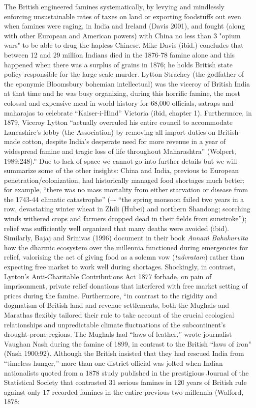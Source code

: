 The British engineered famines systematically, by levying and mindlessly enforcing unsustainable rates of taxes on land or exporting foodstuffs out even when famines were raging, in India and Ireland (Davis 2001), and fought (along with other European and American powers) with China no less than 3 "opium wars" to be able to drug the hapless Chinese. Mike Davis (ibid.) concludes that between 12 and 29 million Indians died in the 1876-78 famine alone and this happened when there was a surplus of grains in 1876; he holds British state policy responsible for the large scale murder. Lytton Strachey (the godfather of the eponymic Bloomsbury bohemian intellectual) was the viceroy of British India at that time and he was busy organizing, during this horrific famine, the most colossal and expensive meal in world history for 68,000 officials, satraps and maharajas to celebrate “Kaiser-i-Hind” Victoria (ibid, chapter 1). Furthermore, in 1879, Viceroy Lytton “actually overruled his entire council to accommodate Lancashire’s lobby (the Association) by removing all import duties on British-made cotton, despite India’s desperate need for more revenue in a year of widespread famine and tragic loss of life throughout Maharashtra” (Wolpert, 1989:248).” Due to lack of space we cannot go into further details but we will summarize some of the other insights: China and India, previous to European penetration/colonization, had historically managed food shortages much better; for example, “there was no mass mortality from either starvation or disease from the 1743-44 climatic catastrophe” (–- “the spring monsoon failed two years in a row, devastating winter wheat in Zhili (Hubei) and northern Shandong; scorching winds withered crops and farmers dropped dead in their fields from sunstroke”); relief was sufficiently well organized that many deaths were avoided (ibid). Similarly, Bajaj and Srinivas (1996) document in their book {\sl Annaṁ Bahukurvīta} how the dharmic ecosystem over the millennia  functioned during emergencies for relief, valorising the act of giving food as a solemn vow ({\sl tadvratam}) rather than expecting free market to work well during shortages. Shockingly, in contrast, Lytton's Anti-Charitable Contributions Act 1877 forbade, on pain of imprisonment, private relief donations that interfered with free market setting of prices during the famine.  Furthermore, “in contrast to the rigidity and dogmatism of British land-and-revenue settlements, both the Mughals and Marathas flexibly tailored their rule to take account of the crucial ecological relationships and unpredictable climate fluctuations of the subcontinent’s drought-prone regions. The Mughals had “laws of leather,” wrote journalist Vaughan Nash during the famine of 1899, in contrast to the British “laws of iron” (Nash 1900:92). Although the British insisted that they had rescued India from “timeless hunger,” more than one district official was jolted when Indian nationalists quoted from a 1878 study published in the prestigious Journal of the Statistical Society that contrasted 31 serious famines in 120 years of British rule against only 17 recorded famines in the entire previous two millennia (Walford, 1878: 